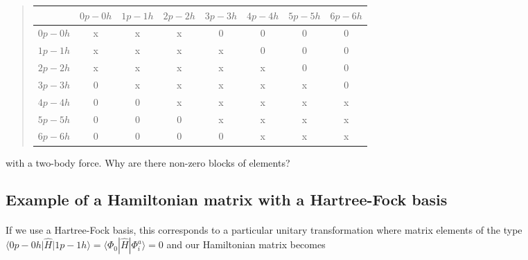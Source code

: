 \begin{quote}
\begin{tabular}{cccccccc}
\hline
\multicolumn{1}{c}{  } & \multicolumn{1}{c}{ $0p-0h$ } & \multicolumn{1}{c}{ $1p-1h$ } & \multicolumn{1}{c}{ $2p-2h$ } & \multicolumn{1}{c}{ $3p-3h$ } & \multicolumn{1}{c}{ $4p-4h$ } & \multicolumn{1}{c}{ $5p-5h$ } & \multicolumn{1}{c}{ $6p-6h$ } \\
\hline
$0p-0h$ & x       & x       & x       & 0       & 0       & 0       & 0       \\
$1p-1h$ & x       & x       & x       & x       & 0       & 0       & 0       \\
$2p-2h$ & x       & x       & x       & x       & x       & 0       & 0       \\
$3p-3h$ & 0       & x       & x       & x       & x       & x       & 0       \\
$4p-4h$ & 0       & 0       & x       & x       & x       & x       & x       \\
$5p-5h$ & 0       & 0       & 0       & x       & x       & x       & x       \\
$6p-6h$ & 0       & 0       & 0       & 0       & x       & x       & x       \\
\hline
\end{tabular}
\end{quote}

\noindent
with a two-body force. Why are there non-zero blocks of elements?



\subsection*{Example of a Hamiltonian matrix with a Hartree-Fock basis}

\paragraph{}
If we use a Hartree-Fock basis, this corresponds to a particular unitary transformation where matrix elements of the type $\langle 0p-0h \vert \hat{H} \vert 1p-1h\rangle =\langle \Phi_0 | \hat{H}|\Phi_{i}^{a}\rangle=0$ and our Hamiltonian matrix becomes 


